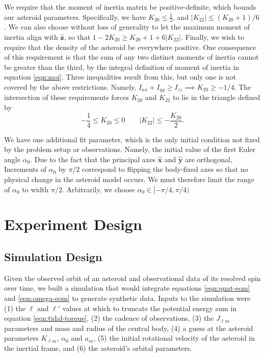 \documentclass[11pt]{article}
\newcommand{\unit}[1]{\hat{\mathbf{#1}}}
\begin{document}
We require that the moment of inertia matrix be positive-definite, which bounds our asteroid parameters. Specifically, we have $K_{20} \leq \frac{1}{2}$, and $|K_{22}| \leq (K_{20}+1)/6$. We can also choose without loss of generality to let the maximum moment of inertia align with $\unit z$, so that $1-2K_{20}\geq K_{20}+1+6|K_{22}|.$ Finally, we wish to require that the density of the asteroid be everywhere positive. One consequence of this requirement is that the sum of any two distinct moments of inertia cannot be greater than the third, by the integral definition of moment of inertia in equation \ref{eqn:moi}. Three inequalities result from this, but only one is not covered by the above restrictions. Namely, $I_{xx} + I_{yy}\geq I_{zz} \implies K_{20} \geq -1/4$. The intersection of these requirements forces $K_{20}$ and $K_{22}$ to lie in the triangle defined by
\begin{equation}
-\frac{1}{4} \leq K_{20} \leq 0 \qquad |K_{22}| \leq -\frac{K_{20}}{2}.
\label{eqn:parameter-bounds}
\end{equation}

We have one additional fit parameter, which is the only initial condition not fixed by the problem setup or observations. Namely, the initial value of the first Euler angle $\alpha_0$. Due to the fact that the principal axes $\unit x$ and $\unit y$ are orthogonal, Increments of $\alpha_0$ by $\pi/2$ correspond to flipping the body-fixed axes so that no physical change in the asteroid model occurs. We must therefore limit the range of $\alpha_0$ to width $\pi/2$. Arbitrarily, we choose $\alpha_0 \in [-\pi/4, \pi/4)$

\section{Experiment Design}
\subsection{Simulation Design}
\label{sec:simulation}
Given the observed orbit of an asteroid and observational data of its resolved spin over time, we built a simulation that would integrate equations \ref{eqn:quat-eom} and \ref{eqn:omega-eom} to generate synthetic data. Inputs to the simulation were (1) the $\ell$ and $\ell'$ values at which to truncate the potential energy sum in equation \ref{eqn:tidal-torque}, (2) the cadence of observations, (3) the $J_{\ell m}$ parameters and mass and radius of the central body, (4) a guess at the asteroid parameters $K_{\ell m}$, $\alpha_0$ and $a_m$, (5) the initial rotational velocity of the asteroid in the inertial frame, and (6) the asteroid's orbital parameters.
\end{document}
